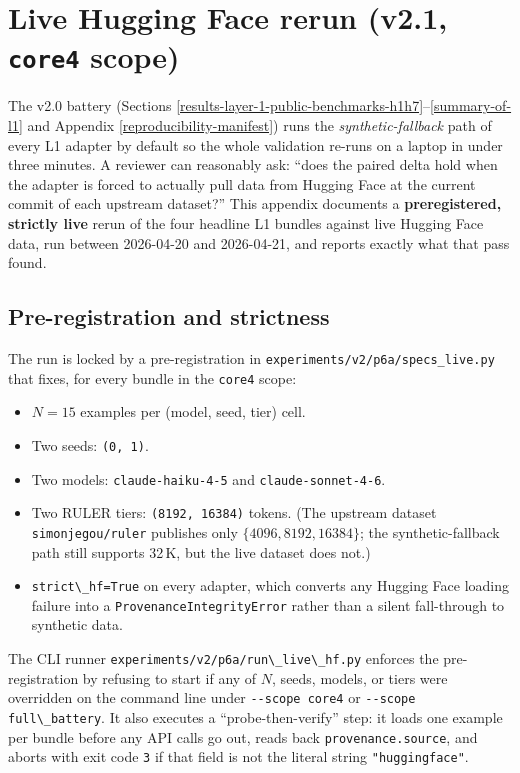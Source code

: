 \section{Live Hugging Face rerun (v2.1, \texttt{core4} scope)}\label{live-hf-rerun-v2.1}

The v2.0 battery (Sections \ref{results-layer-1-public-benchmarks-h1h7}--\ref{summary-of-l1} and
Appendix \ref{reproducibility-manifest}) runs the \emph{synthetic-fallback}
path of every L1 adapter by default so the whole validation re-runs on a
laptop in under three minutes. A reviewer can reasonably ask: ``does the
paired delta hold when the adapter is forced to actually pull data from
Hugging Face at the current commit of each upstream dataset?'' This
appendix documents a \textbf{preregistered, strictly live} rerun of the
four headline L1 bundles against live Hugging Face data, run between
2026-04-20 and 2026-04-21, and reports exactly what that pass found.

\subsection{Pre-registration and strictness}\label{live-hf-prereg}

The run is locked by a pre-registration in
\passthrough{\lstinline!experiments/v2/p6a/specs_live.py!} that fixes, for
every bundle in the \passthrough{\lstinline!core4!} scope:

\begin{itemize}
\tightlist
\item \(N=15\) examples per (model, seed, tier) cell.
\item Two seeds: \passthrough{\lstinline!(0, 1)!}.
\item Two models: \passthrough{\lstinline!claude-haiku-4-5!} and
  \passthrough{\lstinline!claude-sonnet-4-6!}.
\item Two RULER tiers: \passthrough{\lstinline!(8192, 16384)!} tokens.
  (The upstream dataset
  \passthrough{\lstinline!simonjegou/ruler!} publishes only
  \(\{4096, 8192, 16384\}\); the synthetic-fallback path still supports
  32\,K, but the live dataset does not.)
\item \passthrough{\lstinline!strict\_hf=True!} on every adapter, which
  converts any Hugging Face loading failure into a
  \passthrough{\lstinline!ProvenanceIntegrityError!} rather than a
  silent fall-through to synthetic data.
\end{itemize}

The CLI runner
\passthrough{\lstinline!experiments/v2/p6a/run\_live\_hf.py!} enforces the
pre-registration by refusing to start if any of $N$, seeds, models, or
tiers were overridden on the command line under
\passthrough{\lstinline!--scope core4!} or
\passthrough{\lstinline!--scope full\_battery!}. It also executes a
``probe-then-verify'' step: it loads one example per bundle before any
API calls go out, reads back
\passthrough{\lstinline!provenance.source!}, and aborts with exit code
\texttt{3} if that field is not the literal string
\passthrough{\lstinline!"huggingface"!}.

